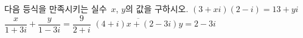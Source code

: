 다음 등식을 만족시키는 실수~$x$, $y$의 값을 구하시오.
 $(3+xi)(2-i)=13+yi$
 $\dfrac{x}{1+3i}+\dfrac{y}{1-3i}=\dfrac{9}{2+i}$
 $\overline{(4+i)x+(2-3i)y}=2-3i$
